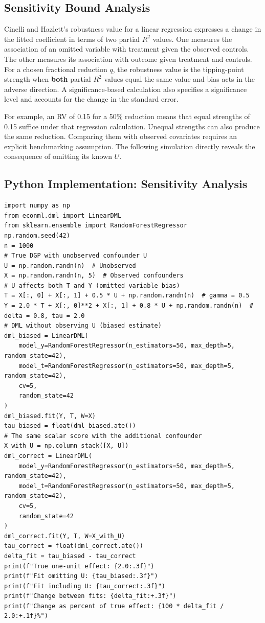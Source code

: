 \subsection{Sensitivity Bound
Analysis}\label{_sensitivity_bound_analysis}

Cinelli and Hazlett's robustness value for a linear regression expresses a change in the fitted coefficient in terms of two partial \(R^2\) values. One measures the association of an omitted variable with treatment given the observed controls. The other measures its association with outcome given treatment and controls. For a chosen fractional reduction \(q\), the robustness value is the tipping-point strength when \textbf{both} partial \(R^2\) values equal the same value and bias acts in the adverse direction. A significance-based calculation also specifies a significance level and accounts for the change in the standard error.

For example, an RV of 0.15 for a 50\% reduction means that equal strengths of 0.15 suffice under that regression calculation. Unequal strengths can also produce the same reduction. Comparing them with observed covariates requires an explicit benchmarking assumption. The following simulation directly reveals the consequence of omitting its known \(U\).

\subsection{Python Implementation: Sensitivity
Analysis}\label{_python_implementation_sensitivity_analysis}

\begin{verbatim}
import numpy as np
from econml.dml import LinearDML
from sklearn.ensemble import RandomForestRegressor
np.random.seed(42)
n = 1000
# True DGP with unobserved confounder U
U = np.random.randn(n)  # Unobserved
X = np.random.randn(n, 5)  # Observed confounders
# U affects both T and Y (omitted variable bias)
T = X[:, 0] + X[:, 1] + 0.5 * U + np.random.randn(n)  # gamma = 0.5
Y = 2.0 * T + X[:, 0]**2 + X[:, 1] + 0.8 * U + np.random.randn(n)  # delta = 0.8, tau = 2.0
# DML without observing U (biased estimate)
dml_biased = LinearDML(
    model_y=RandomForestRegressor(n_estimators=50, max_depth=5, random_state=42),
    model_t=RandomForestRegressor(n_estimators=50, max_depth=5, random_state=42),
    cv=5,
    random_state=42
)
dml_biased.fit(Y, T, W=X)
tau_biased = float(dml_biased.ate())
# The same scalar score with the additional confounder
X_with_U = np.column_stack([X, U])
dml_correct = LinearDML(
    model_y=RandomForestRegressor(n_estimators=50, max_depth=5, random_state=42),
    model_t=RandomForestRegressor(n_estimators=50, max_depth=5, random_state=42),
    cv=5,
    random_state=42
)
dml_correct.fit(Y, T, W=X_with_U)
tau_correct = float(dml_correct.ate())
delta_fit = tau_biased - tau_correct
print(f"True one-unit effect: {2.0:.3f}")
print(f"Fit omitting U: {tau_biased:.3f}")
print(f"Fit including U: {tau_correct:.3f}")
print(f"Change between fits: {delta_fit:+.3f}")
print(f"Change as percent of true effect: {100 * delta_fit / 2.0:+.1f}%")
\end{verbatim}

